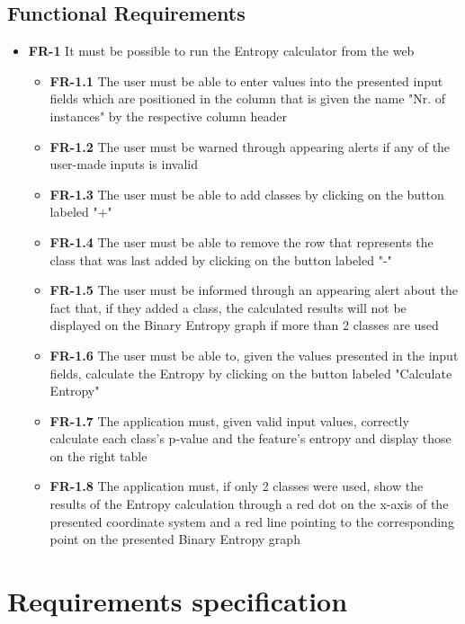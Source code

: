\subsection{Functional Requirements}
\begin{itemize}
  \item \textbf{FR-1} It must be possible to run the Entropy calculator from the web
  \begin{itemize}
      \item \textbf{FR-1.1} The user must be able to enter values into the presented input fields which are positioned in the column that is given the name "Nr. of instances" by the respective column header
      \item \textbf{FR-1.2} The user must be warned through appearing alerts if any of the user-made inputs is invalid
      \item \textbf{FR-1.3} The user must be able to add classes by clicking on the button labeled "+"
      \item \textbf{FR-1.4} The user must be able to remove the row that represents the class that was last added by clicking on the button labeled "-"
      \item \textbf{FR-1.5} The user must be informed through an appearing alert about the fact that, if they added a class, the calculated results will not be displayed on the Binary Entropy graph if more than 2 classes are used
      \item \textbf{FR-1.6} The user must be able to, given the values presented in the input fields, calculate the Entropy by clicking on the button labeled "Calculate Entropy"
      \item \textbf{FR-1.7} The application must, given valid input values, correctly calculate each class's p-value and the feature's entropy and display those on the right table
      \item \textbf{FR-1.8} The application must, if only 2 classes were used, show the results of the Entropy calculation through a red dot on the x-axis of the presented coordinate system and a red line pointing to the corresponding point on the presented Binary Entropy graph 
    \end{itemize}
\end{itemize}

\section{Requirements specification}
